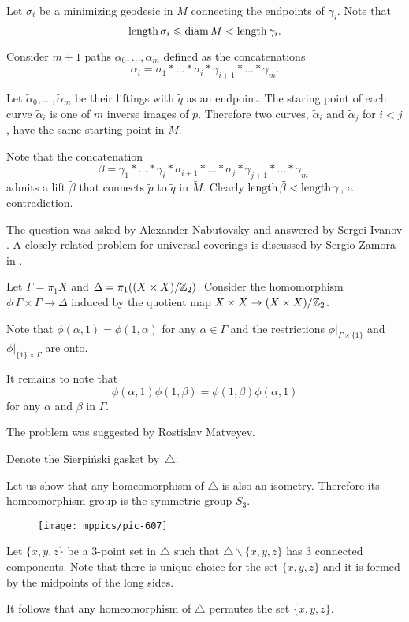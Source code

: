 Let $\sigma_i$ be a minimizing geodesic in $M$ connecting the endpoints of $\gamma_i$. 
Note that 
\[\operatorname{\rm length}\sigma_i\leqslant \operatorname{\rm diam}\nolimits M< \operatorname{\rm length}\gamma_i.\] 

Consider $m+1$ paths $\alpha_0,\dots,\alpha_m$ defined as the concatenations 
\[\alpha_i=\sigma_1{*}\dots{*}\sigma_i{*}\gamma_{i+1}{*}\dots{*}\gamma_m.\]

Let $\tilde\alpha_0,\dots,\tilde\alpha_m$ be their liftings
with $\tilde q$ as an endpoint.
The staring point of each curve $\tilde\alpha_i$ is one of $m$ inverse images of $p$. 
Therefore two curves, $\tilde\alpha_i$ and $\tilde\alpha_j$ for $i<j$, 
have the same starting point in $\tilde M$.

Note that the concatenation
\[\beta=\gamma_1{*}\dots{*}\gamma_i{*}\sigma_{i+1}{*}\dots{*}\sigma_j{*}\gamma_{j+1}{*}\dots{*}\gamma_m.\]
admits a lift $\tilde\beta$ that connects $\tilde p$ to $\tilde q$ in $\tilde M$.
Clearly $\operatorname{\rm length} \tilde\beta<\operatorname{\rm length} \gamma$, a contradiction.
\qeds

The question was asked by Alexander  Nabutovsky
and answered by Sergei Ivanov \cite{ivanov}.
A closely related problem for universal coverings is discussed by Sergio Zamora in \cite{zamora}.



Let $\Gamma=\pi_1 X$ and $\Delta=\pi_1((X\times X)/\mathbb{Z}_2)$.
Consider the homomorphism $\phi\:\Gamma\times \Gamma\to \Delta$
induced by the quotient map $X\times X\to (X\times X)/\mathbb{Z}_2$.

Note that $\phi(\alpha,1)=\phi(1,\alpha)$ for any $\alpha\in \Gamma$ and the restrictions $\phi|_{\Gamma\times \{1\}}$ and $\phi|_{\{1\}\times\Gamma}$
are onto.

It remains to note that 
$$\phi(\alpha,1)\phi(1,\beta)=\phi(1,\beta)\phi(\alpha,1)$$
for any $\alpha$ and $\beta$ in $\Gamma$.
\qeds

 
The problem was suggested by Rostislav Matveyev.




Denote the Sierpi\'nski gasket by~$\triangle$.

Let us show that any homeomorphism of $\triangle$ is also an isometry.
Therefore its homeomorphism group is the symmetric group $S_3$. 

{

\begin{wrapfigure}{r}{23 mm}
\vskip-4mm
\centering
\texttt{[image: mppics/pic-607]}
\end{wrapfigure}
Let $\{x,y,z\}$ be a 3-point set in $\triangle$ such that $\triangle \backslash\{x,y,z\}$ has 3 connected components.
Note that there is unique choice for the set $\{x,y,z\}$ and 
it is formed by the midpoints of the long sides.

It follows that any homeomorphism of $\triangle$ permutes the set $\{x,y,z\}$.

}

